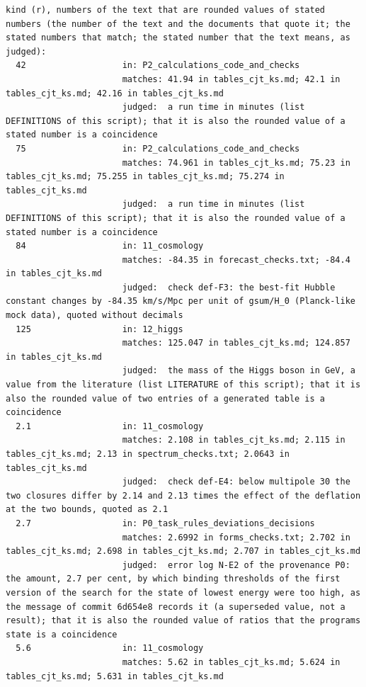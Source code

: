 \documentclass[
  10pt,
]{article}
\begin{document}
\begin{verbatim}
kind (r), numbers of the text that are rounded values of stated numbers (the number of the text and the documents that quote it; the stated numbers that match; the stated number that the text means, as judged):
  42                   in: P2_calculations_code_and_checks
                       matches: 41.94 in tables_cjt_ks.md; 42.1 in tables_cjt_ks.md; 42.16 in tables_cjt_ks.md
                       judged:  a run time in minutes (list DEFINITIONS of this script); that it is also the rounded value of a stated number is a coincidence
  75                   in: P2_calculations_code_and_checks
                       matches: 74.961 in tables_cjt_ks.md; 75.23 in tables_cjt_ks.md; 75.255 in tables_cjt_ks.md; 75.274 in tables_cjt_ks.md
                       judged:  a run time in minutes (list DEFINITIONS of this script); that it is also the rounded value of a stated number is a coincidence
  84                   in: 11_cosmology
                       matches: -84.35 in forecast_checks.txt; -84.4 in tables_cjt_ks.md
                       judged:  check def-F3: the best-fit Hubble constant changes by -84.35 km/s/Mpc per unit of gsum/H_0 (Planck-like mock data), quoted without decimals
  125                  in: 12_higgs
                       matches: 125.047 in tables_cjt_ks.md; 124.857 in tables_cjt_ks.md
                       judged:  the mass of the Higgs boson in GeV, a value from the literature (list LITERATURE of this script); that it is also the rounded value of two entries of a generated table is a coincidence
  2.1                  in: 11_cosmology
                       matches: 2.108 in tables_cjt_ks.md; 2.115 in tables_cjt_ks.md; 2.13 in spectrum_checks.txt; 2.0643 in tables_cjt_ks.md
                       judged:  check def-E4: below multipole 30 the two closures differ by 2.14 and 2.13 times the effect of the deflation at the two bounds, quoted as 2.1
  2.7                  in: P0_task_rules_deviations_decisions
                       matches: 2.6992 in forms_checks.txt; 2.702 in tables_cjt_ks.md; 2.698 in tables_cjt_ks.md; 2.707 in tables_cjt_ks.md
                       judged:  error log N-E2 of the provenance P0: the amount, 2.7 per cent, by which binding thresholds of the first version of the search for the state of lowest energy were too high, as the message of commit 6d654e8 records it (a superseded value, not a result); that it is also the rounded value of ratios that the programs state is a coincidence
  5.6                  in: 11_cosmology
                       matches: 5.62 in tables_cjt_ks.md; 5.624 in tables_cjt_ks.md; 5.631 in tables_cjt_ks.md

\end{verbatim}
\end{document}
